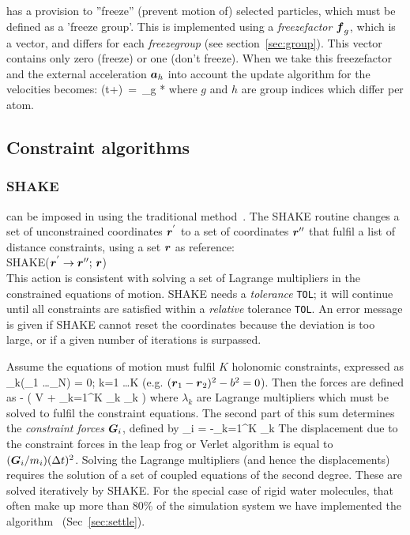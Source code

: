 \gromacs has a provision to ''freeze''  (prevent motion of) selected
particles, which must be defined as a 'freeze group'. This is implemented
using a {\em freezefactor $\mbox{\boldmath ${f}$}_g$}, which is a vector, and differs for each
{\em freezegroup} (see section~\ref{sec:group}). This vector contains only
zero (freeze) or one (don't freeze).
When we take this freezefactor and the external acceleration $\mbox{\boldmath ${a}$}_h$ into 
account the update algorithm for the velocities becomes:
\beq
{}(t+\hdt)~=~_g * \lambda * 
\eeq
where $g$ and $h$ are group indices which differ per atom.

\subsection{Constraint algorithms}

\subsubsection*{SHAKE}
 can be imposed in {\gromacs} using the traditional 
method~\cite{Ryckaert77}. The SHAKE routine changes a set of unconstrained
coordinates $\mbox{\boldmath ${r}$}^{'}$ to a set of coordinates $\mbox{\boldmath ${r}$}''$ that
fulfil a  list of distance constraints, using a set $\mbox{\boldmath ${r}$}$ as
reference: \\[1ex] 
\hspace*{5em} SHAKE($\mbox{\boldmath ${r}$}^{'} \rightarrow  \mbox{\boldmath ${r}$}'';\,  \mbox{\boldmath ${r}$}$) \\[1ex]
This action is consistent with solving a set of Lagrange multipliers
in the constrained equations of motion. SHAKE needs a {\em tolerance}
\verb'TOL'; it will continue until all constraints are satisfied
within a {\em relative} tolerance \verb'TOL'. An error message is
given if SHAKE cannot reset the coordinates because the deviation is
too large, or if a given number of iterations is surpassed. 

Assume the equations of motion must fulfil $K$ holonomic constraints,
expressed as
\beq
\sigma_k(_1 \ldots {}_N) = 0; \;\; k=1 \ldots K
\eeq
(e.g. $(\mbox{\boldmath ${r}$}_1 - \mbox{\boldmath ${r}$}_2)^2 - b^2 = 0$). 
Then the forces are defined as 
\beq
-  \left( V + \sum_{k=1}^K \lambda_k
\sigma_k \right)
\eeq
where $\lambda_k$ are Lagrange multipliers which must be solved to
fulfil the constraint equations. The second part of this sum
determines the {\em constraint forces} $\mbox{\boldmath ${G}$}_i$, defined by
\beq
{}_i = -\sum_{k=1}^K \lambda_k 
\eeq
The displacement due to the constraint forces in the leap frog or
Verlet algorithm is equal to $(\mbox{\boldmath ${G}$}_i/m_i)({\Delta t})^2$. Solving the
Lagrange multipliers (and hence the displacements) requires the
solution of a set of coupled equations of the second degree. These are
solved iteratively by SHAKE.
For the special case of rigid water molecules, that often make up more
than 80\% of the simulation system we have implemented the 
algorithm~\cite{Miyamoto92} (Sec~\ref{sec:settle}).


